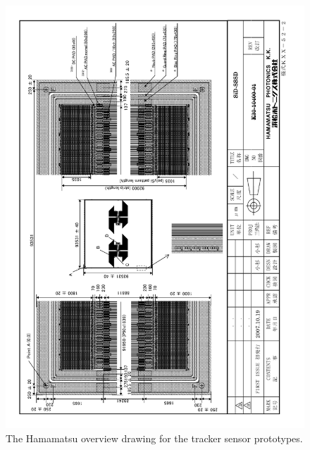 \documentclass[prc,12pt,nofootinbib,letterpaper]{revtex4}
\begin{document}
\begin{figure}[p]
\begin{center}
    \includegraphics[width=6in]{figures/SiD-SSSD}
\caption{The Hamamatsu overview drawing for the tracker sensor prototypes.}
\label{fig:drawing}
\end{center}
\end{figure}
\end{document}
